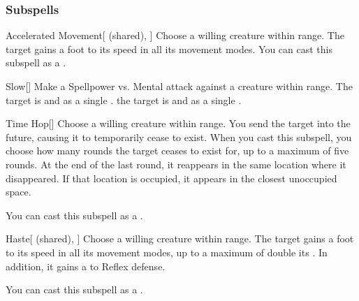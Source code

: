 \subsubsection{Subspells}


\begin{ability}[\nth{1}]{Accelerated Movement}[ (shared), ]
Choose a willing creature within \rngmed range.
The target gains a  foot  to its speed in all its movement modes.
You can cast this subspell as a .
\end{ability}
\vspace{0.25em}


\begin{ability}[\nth{1}]{Slow}[]
Make a Spellpower vs. Mental attack against a creature within \rngmed range.
\hit The target is  and  as a single .
\crit the target is  and  as a single .
\end{ability}
\vspace{0.25em}


\begin{ability}[\nth{2}]{Time Hop}[]
Choose a willing creature within \rngmed range.
You send the target into the future, causing it to temporarily cease to exist.
When you cast this subspell, you choose how many rounds the target ceases to exist for, up to a maximum of five rounds.
At the end of the last round, it reappears in the same location where it disappeared.
If that location is occupied, it appears in the closest unoccupied space.

You can cast this subspell as a .
\end{ability}
\vspace{0.25em}


\begin{ability}[\nth{3}]{Haste}[ (shared), ]
Choose a willing creature within \rngmed range.
The target gains a  foot  to its speed in all its movement modes, up to a maximum of double its .
In addition, it gains a   to Reflex defense.

You can cast this subspell as a .
\end{ability}
\vspace{0.25em}



